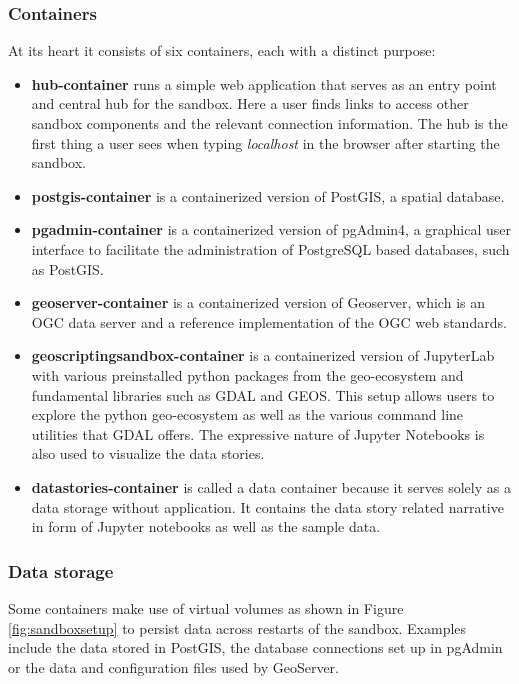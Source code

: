 \documentclass[11pt, a4paper, oneside, parskip=full-]{scrartcl}
\begin{document}
\subsubsection*{Containers}
At its heart it consists of six containers, each with a distinct purpose:

\begin{itemize}
  \item \textbf{hub-container} runs a simple web application that serves as an
  entry point and central hub for the sandbox. Here a user finds links to access
  other sandbox components and the relevant connection information. The hub is
  the first thing a user sees when typing \emph{localhost} in the browser after
  starting the sandbox.
  \item \textbf{postgis-container} is a containerized version of PostGIS, a
  spatial database.
  \item \textbf{pgadmin-container} is a containerized version of pgAdmin4, a
  graphical user interface to facilitate the administration of PostgreSQL based
  databases, such as PostGIS.
  \item \textbf{geoserver-container} is a containerized version of Geoserver,
  which is an OGC data server and a reference implementation of the OGC web
  standards.
  \item \textbf{geoscriptingsandbox-container} is a containerized version of
  JupyterLab with various preinstalled python packages from the geo-ecosystem
  and fundamental libraries such as GDAL and GEOS\cite{geos}. This setup allows
  users to explore the python geo-ecosystem as well as the various command line
  utilities that GDAL offers. The expressive nature of Jupyter Notebooks is also
  used to visualize the data stories.
  \item \textbf{datastories-container} is called a data container because it
  serves solely as a data storage without application. It contains the data
  story related narrative in form of Jupyter notebooks as well as the sample
  data.
\end{itemize}

\subsubsection*{Data storage}
Some containers make use of virtual volumes as shown in Figure
\ref{fig:sandboxsetup} to persist data across restarts of the sandbox. Examples
include the data stored in PostGIS, the database connections set up in pgAdmin
or the data and configuration files used by GeoServer.
\end{document}
